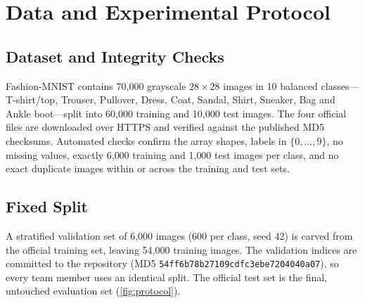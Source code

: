 \documentclass[conference]{IEEEtran}
\begin{document}
\section{Data and Experimental Protocol}
\label{sec:protocol}

\subsection{Dataset and Integrity Checks}
Fashion-MNIST contains 70{,}000 grayscale $28\times28$ images in 10 balanced classes---T-shirt/top, Trouser, Pullover,
Dress, Coat, Sandal, Shirt, Sneaker, Bag and Ankle boot---split into 60{,}000 training and 10{,}000 test images. The four
official files are downloaded over HTTPS and verified against the published MD5 checksums. Automated checks confirm the
array shapes, labels in $\{0,\dots,9\}$, no missing values, exactly 6{,}000 training and 1{,}000 test images per class,
and no exact duplicate images within or across the training and test sets.

\subsection{Fixed Split}
A stratified validation set of 6{,}000 images (600 per class, seed 42) is carved from the official training set, leaving
54{,}000 training images. The validation indices are committed to the repository (MD5
\texttt{54ff6b78\allowbreak b27109cd\allowbreak fc3ebe72\allowbreak 04040a07}), so every team member uses an identical
split. The official test set is the final, untouched evaluation set (\cref{fig:protocol}).
\end{document}
